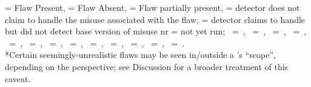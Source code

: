 
\begin{table}[t]
    \centering
    \scriptsize
    \caption{\small Flaws observed in different static crypto-detectors}
    
	
    \label{tbl:flaw_to_tools}
	\noindent{}
\begin{flushleft}
{\footnotesize \no{} = Flaw Present, \ye{} = Flaw Absent, \pr{} = Flaw partially present, \na = detector does not claim to handle the misuse associated with the flaw, \np= detector claims to handle but did not detect base version of misuse nr =  not yet run; \sonarqubeshort~=~\sonarqube, \snykshort~=~\snyk, \codigashort~=~\codiga, \deepsourceshort~=~\deepsource, \newcodeqlshort~=~\newcodeql, \newcryptoguardshort~=~\cryptoguardupdate, \newcognicryptshort~=~\cognicryptupdate, \newspotbugsshort~=~\spotbugsupdate, \newcoverityshort~=~\coverityupdate, \newqarkshort~=~\qarkupdate, \newshiftleftshort~=~\shiftleftupdate, \newcqversion~=~\codeqlversion, \newlgtmshort~=~\newlgtm.\\
*Certain seemingly-unrealistic flaws may be seen in/outside a \detector's ``scope'', depending on the perspective; see Discussion for a broader treatment of this caveat.
}
\end{flushleft}
\end{table}
